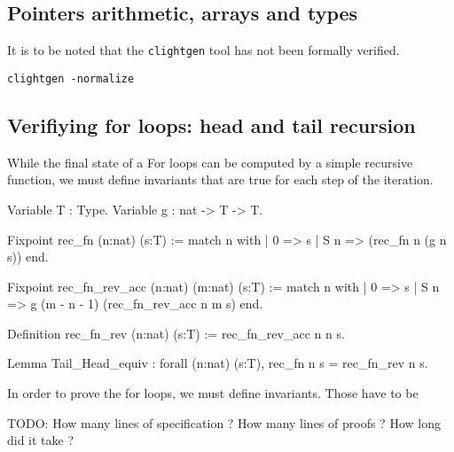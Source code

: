 \subsection{Pointers arithmetic, arrays and types}


It is to be noted that the \texttt{clightgen} tool has not been formally verified.

\texttt{clightgen -normalize}

%
%
%

\subsection{Verifiying for loops: head and tail recursion}

While the final state of a For loops can be computed by a simple recursive function,
we must define invariants that are true for each step of the iteration.

\begin{coqD}
Variable T : Type.
Variable g : nat -> T -> T.

Fixpoint rec_fn (n:nat) (s:T) :=
  match n with
  | 0 => s
  | S n => (rec_fn n (g n s))
  end.

Fixpoint rec_fn_rev_acc (n:nat) (m:nat) (s:T) :=
  match n with
  | 0 => s
  | S n => g (m - n - 1) (rec_fn_rev_acc n m s)
  end.

Definition rec_fn_rev (n:nat) (s:T) :=
  rec_fn_rev_acc n n s.

Lemma Tail_Head_equiv :
  forall (n:nat) (s:T),
  rec_fn n s = rec_fn_rev n s.
\end{coqD}


In order to prove the for loops, we must define invariants.
Those have to be


TODO:
How many lines of specification ?
How many lines of proofs ?
How long did it take ?
